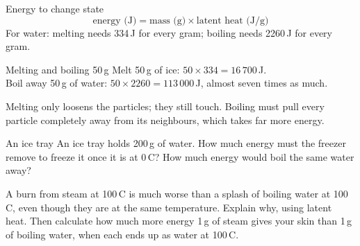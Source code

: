 \begin{skillbox}{Energy to change state}
\[ \text{energy (J)} = \text{mass (g)} \times \text{latent heat (J/g)} \]
For water: melting needs 334\,J for every gram; boiling needs 2260\,J for every gram.
\end{skillbox}

\begin{workedex}{Melting and boiling 50\,g}
Melt 50\,g of ice: $50 \times 334 = 16\,700$\,J.\\
Boil away 50\,g of water: $50 \times 2260 = 113\,000$\,J, almost seven times as much.

\smallskip
Melting only loosens the particles; they still touch. Boiling must pull every particle completely away from its neighbours, which takes far more energy.
\end{workedex}

\begin{wedo}{An ice tray}
An ice tray holds 200\,g of water. How much energy must the freezer remove to freeze it once it is at 0\,\textdegree C? How much energy would boil the same water away?
\workbox{5cm}
\end{wedo}

\label{prac:4}


\label{ext:4}

\task A burn from steam at 100\,\textdegree C is much worse than a splash of boiling water at 100\,\textdegree C, even though they are at the same temperature. Explain why, using latent heat. Then calculate how much more energy 1\,g of steam gives your skin than 1\,g of boiling water, when each ends up as water at 100\,\textdegree C.
\answerbox{8cm}

\clearpage

\setcounter{section}{4}\renewcommand{\lessonart}{12}
\label{sec:5}


\clearpage

